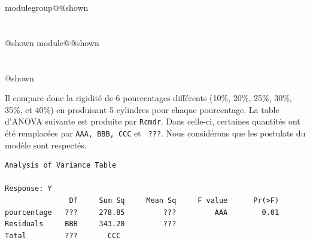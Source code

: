 \documentclass{Evaluation}
\makeatletter
\newcommand{\currentmodulekey}{}
\newcommand{\currentmoduletitle}{}
\newcommand{\currentgroupkey}{}
\newcommand{\currentgrouptitle}{}
\newcommand{\showmoduleifneeded}{%
  \ifx\currentgroupkey\empty\else
    \expandafter\ifx\csname modulegroup@\currentgroupkey @shown\endcsname\relax
      \section*{\currentgrouptitle}%
      \expandafter\gdef\csname modulegroup@\currentgroupkey @shown\endcsname{1}%
    \fi
  \fi
  \expandafter\ifx\csname module@\currentmodulekey @shown\endcsname\relax
    \section*{\currentmoduletitle}%
    \expandafter\gdef\csname module@\currentmodulekey @shown\endcsname{1}%
  \fi
}
\newenvironment{A24}{\showmoduleifneeded}{}
\makeatother
\begin{document}
\begin{questions}
\begin{A24}
Il compare donc la rigidité de 6 pourcentages différents (10\%, 20\%, 25\%, 30\%, 35\%, et 40\%) en produisant 5 cylindres pour chaque pourcentage.
La table d'ANOVA suivante est produite par \texttt{Rcmdr}. 
Dans celle-ci, certaines quantités ont été remplacées par \texttt{AAA, BBB, CCC} et \texttt{ ???}. Nous considérons que les postulats du modèle sont respectés.
\begin{verbatim}
Analysis of Variance Table

Response: Y
               Df     Sum Sq     Mean Sq     F value      Pr(>F)  
pourcentage   ???     278.85         ???         AAA        0.01 
Residuals     BBB     343.20         ???                  
Total         ???       CCC
\end{verbatim}

\end{A24}
\end{questions}
\end{document}
